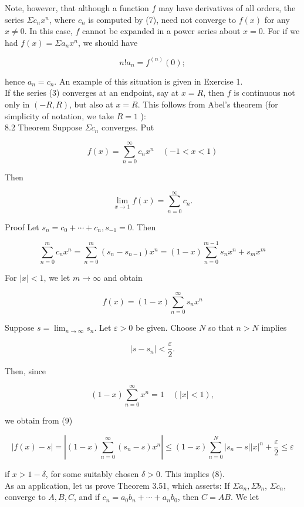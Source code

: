 \documentclass[10pt]{article}
\begin{document}
Note, however, that although a function $f$ may have derivatives of all orders, the series $\Sigma c_{n} x^{n}$, where $c_{n}$ is computed by (7), need not converge to $f(x)$ for any $x \neq 0$. In this case, $f$ cannot be expanded in a power series about $x=0$. For if we had $f(x)=\Sigma a_{n} x^{n}$, we should have

$$
n!a_{n}=f^{(n)}(0) ;
$$

hence $a_{n}=c_{n}$. An example of this situation is given in Exercise 1.\\
If the series (3) converges at an endpoint, say at $x=R$, then $f$ is continuous not only in $(-R, R)$, but also at $x=R$. This follows from Abel's theorem (for simplicity of notation, we take $R=1$ ):\\
8.2 Theorem Suppose $\Sigma c_{n}$ converges. Put

$$
f(x)=\sum_{n=0}^{\infty} c_{n} x^{n} \quad(-1<x<1)
$$

Then


\begin{equation*}
\lim _{x \rightarrow 1} f(x)=\sum_{n=0}^{\infty} c_{n} . \tag{8}
\end{equation*}


Proof Let $s_{n}=c_{0}+\cdots+c_{n}, s_{-1}=0$. Then

$$
\sum_{n=0}^{m} c_{n} x^{n}=\sum_{n=0}^{m}\left(s_{n}-s_{n-1}\right) x^{n}=(1-x) \sum_{n=0}^{m-1} s_{n} x^{n}+s_{m} x^{m}
$$

For $|x|<1$, we let $m \rightarrow \infty$ and obtain


\begin{equation*}
f(x)=(1-x) \sum_{n=0}^{\infty} s_{n} x^{n} \tag{9}
\end{equation*}


Suppose $s=\lim _{n \rightarrow \infty} s_{n}$. Let $\varepsilon>0$ be given. Choose $N$ so that $n>N$ implies

$$
\left|s-s_{n}\right|<\frac{\varepsilon}{2} .
$$

Then, since

$$
(1-x) \sum_{n=0}^{\infty} x^{n}=1 \quad(|x|<1),
$$

we obtain from (9)

$$
|f(x)-s|=\left|(1-x) \sum_{n=0}^{\infty}\left(s_{n}-s\right) x^{n}\right| \leq(1-x) \sum_{n=0}^{N}\left|s_{n}-s\right||x|^{n}+\frac{\varepsilon}{2} \leq \varepsilon
$$

if $x>1-\delta$, for some suitably chosen $\delta>0$. This implies (8).\\
As an application, let us prove Theorem 3.51, which asserts: If $\Sigma a_{n}, \Sigma b_{n}$, $\Sigma c_{n}$, converge to $A, B, C$, and if $c_{n}=a_{0} b_{n}+\cdots+a_{n} b_{0}$, then $C=A B$. We let
\end{document}
